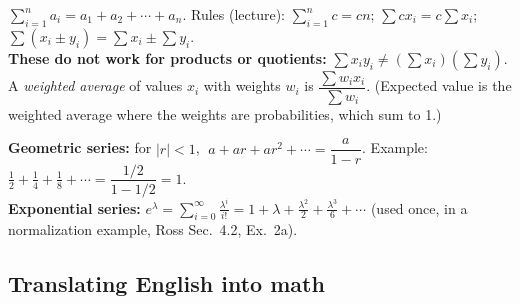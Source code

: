 \documentclass[11pt]{article}
\let\oldsubsection\subsection
\renewcommand{\subsection}{\Needspace{14\baselineskip}\oldsubsection}
\begin{document}
\begin{defbox}
$\displaystyle\sum_{i=1}^{n}a_i=a_1+a_2+\cdots+a_n$. Rules (lecture): $\sum_{i=1}^n c=cn$; $\sum cx_i=c\sum x_i$; $\sum(x_i\pm y_i)=\sum x_i\pm\sum y_i$.\\
\textbf{These do not work for products or quotients:} $\sum x_iy_i\neq\left(\sum x_i\right)\left(\sum y_i\right)$.\\
A \emph{weighted average} of values $x_i$ with weights $w_i$ is $\dfrac{\sum w_ix_i}{\sum w_i}$. (Expected value is the weighted average where the weights are probabilities, which sum to 1.)
\end{defbox}

\begin{defbox}
\textbf{Geometric series:} for $|r|<1$, $\;a+ar+ar^2+\cdots=\dfrac{a}{1-r}$. Example: $\tfrac12+\tfrac14+\tfrac18+\cdots=\dfrac{1/2}{1-1/2}=1$.\\
\textbf{Exponential series:} $e^{\lambda}=\displaystyle\sum_{i=0}^{\infty}\frac{\lambda^i}{i!}=1+\lambda+\frac{\lambda^2}{2}+\frac{\lambda^3}{6}+\cdots$ (used once, in a normalization example, Ross Sec.~4.2, Ex.~2a).
\end{defbox}

\subsection{Translating English into math}
\end{document}
